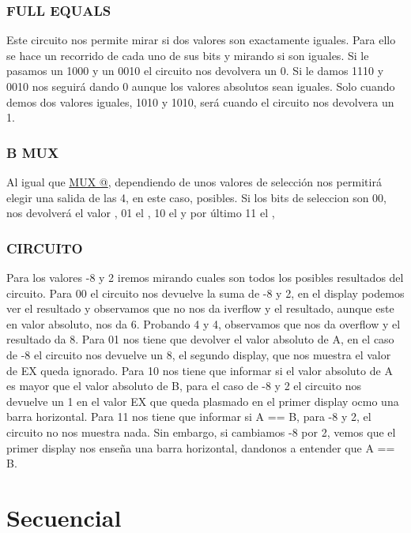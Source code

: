 \documentclass{article}
\begin{document}
\subsubsection{FULL EQUALS}
Este circuito nos permite mirar si dos valores son exactamente iguales. Para ello se hace un recorrido de cada uno de sus bits y mirando si son iguales. Si le pasamos un 1000 y un 0010 el circuito nos devolvera un 0. Si le damos 1110 y 0010 nos seguirá dando 0 aunque los valores absolutos sean iguales. Solo cuando demos dos valores iguales, 1010 y 1010, será cuando el circuito nos devolvera un 1.

\subsubsection{B MUX}
Al igual que \hyperref[sec:MUX@]{MUX @}, dependiendo de unos valores de selección nos permitirá elegir una salida de las 4, en este caso, posibles. Si los bits de seleccion son 00, nos devolverá el valor , 01 el , 10 el  y por último 11 el ,

\subsubsection{CIRCUITO}
Para los valores -8 y 2 iremos mirando cuales son todos los posibles resultados del circuito. Para 00 el circuito nos devuelve la suma de -8 y 2, en el display podemos ver el resultado y observamos que no nos da iverflow y el resultado, aunque este en valor absoluto, nos da 6. Probando 4 y 4, observamos que nos da overflow y el resultado da 8. Para 01 nos tiene que devolver el valor absoluto de A, en el caso de -8 el circuito nos devuelve un 8, el segundo display, que nos muestra el valor de EX queda ignorado. Para 10 nos tiene que informar si el valor absoluto de A es mayor que el valor absoluto de B, para el caso de -8 y 2 el circuito nos devuelve un 1 en el valor EX que queda plasmado en el primer display ocmo una barra horizontal. Para 11 nos tiene que informar si A == B, para -8 y 2, el circuito no nos muestra nada. Sin embargo, si cambiamos -8 por 2, vemos que el primer display nos enseña una barra horizontal, dandonos a entender que A == B.
\newpage

\section{Secuencial}
\end{document}

